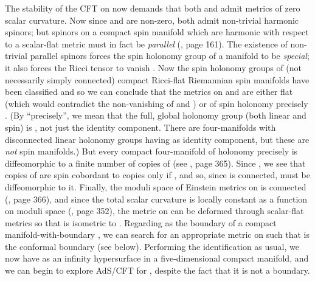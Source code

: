 \documentclass[a4paper,12pt]{article}
\theoremstyle{definition}
\renewcommand{\u}{\textit}
\renewcommand{\-}{\myHighlight{$\dfrac{\quad\enspace}{\quad}$}\coordHE{}}
\begin{document}
The stability of the CFT on \coordHE{} now demands that both \coordHE{} and \coordHE{} admit metrics of zero scalar curvature. Now since \coordHE{} and \coordHE{} are non-zero, both admit non-trivial harmonic spinors; but spinors on a compact spin manifold which are harmonic with respect to a scalar-flat metric must in fact be \u{parallel} (\cite{12}, page 161). The existence of non-trivial parallel spinors forces the spin holonomy group of a manifold to be \u{special}; it also forces the Ricci tensor to vanish \cite{18}. Now the spin holonomy groups of (not necessarily simply connected) compact Ricci-flat Riemannian spin manifolds have been classified \cite{19} and so we can conclude that the metrics on \coordHE{} and \coordHE{} are either flat (which would contradict the non-vanishing of \coordHE{} and \coordHE{}) or of spin holonomy precisely \coordHE{}. (By ``precisely'', we mean that the full, global holonomy group (both linear and spin) is \coordHE{}, not just the identity component. There are four-manifolds with disconnected linear holonomy groups having \coordHE{} as identity component, but these are \u{not} spin manifolds.) But every compact four-manifold of holonomy precisely \coordHE{} is diffeomorphic to a finite number of copies of \coordHE{} (see \cite{8}, page 365). Since \coordHE{}, we see that \coordHE{} copies of \coordHE{} are spin cobordant to \coordHE{} copies only if \coordHE{}, and so, since \coordHE{} is connected, \coordHE{} must be diffeomorphic to it. Finally, the moduli space of Einstein metrics on \coordHE{} is connected (\cite{8}, page 366), and since the total scalar curvature is locally constant as a function on moduli space (\cite{8}, page 352), the \coordHE{} metric on \coordHE{} can be deformed through scalar-flat metrics so that \coordHE{} is isometric to \coordHE{}. Regarding \coordHE{} as the boundary of a compact manifold-with-boundary \coordHE{}, we can search for an appropriate metric \coordHE{} on \coordHE{} such that \coordHE{} is the conformal boundary (see below). Performing the identification as usual, we now have \coordHE{} as an infinity hypersurface in a five-dimensional compact manifold, and we can begin to explore AdS/CFT for \coordHE{}, despite the fact that it is not a boundary.
\end{document}
